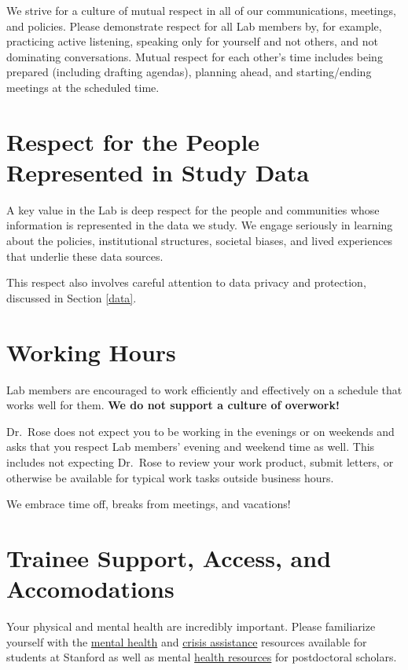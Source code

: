 \documentclass[
]{book}
\begin{document}
We strive for a culture of mutual respect in all of our communications, meetings, and policies. Please demonstrate respect for all Lab members by, for example, practicing active listening, speaking only for yourself and not others, and not dominating conversations. Mutual respect for each other's time includes being prepared (including drafting agendas), planning ahead, and starting/ending meetings at the scheduled time.

\hypertarget{respect-for-the-people-represented-in-study-data}{%
\section{Respect for the People Represented in Study Data}\label{respect-for-the-people-represented-in-study-data}}

A key value in the Lab is deep respect for the people and communities whose information is represented in the data we study. We engage seriously in learning about the policies, institutional structures, societal biases, and lived experiences that underlie these data sources.

This respect also involves careful attention to data privacy and protection, discussed in Section \ref{data}.

\hypertarget{working-hours}{%
\section{Working Hours}\label{working-hours}}

Lab members are encouraged to work efficiently and effectively on a schedule that works well for them. \textbf{We do not support a culture of overwork!}

Dr.~Rose does not expect you to be working in the evenings or on weekends and asks that you respect Lab members' evening and weekend time as well. This includes not expecting Dr.~Rose to review your work product, submit letters, or otherwise be available for typical work tasks outside business hours.

We embrace time off, breaks from meetings, and vacations!

\hypertarget{trainee-support-access-and-accomodations}{%
\section{Trainee Support, Access, and Accomodations}\label{trainee-support-access-and-accomodations}}

Your physical and mental health are incredibly important. Please familiarize yourself with the \href{https://studentaffairs.stanford.edu/mental-health-resources-stanford}{mental health} and \href{https://glo.stanford.edu/glo-services/crisis-assistance}{crisis assistance} resources available for students at Stanford as well as mental \href{https://postdocbenefits.stanford.edu/my-benefits/medical-coverage/mental-health-resources}{health resources} for postdoctoral scholars.
\end{document}

